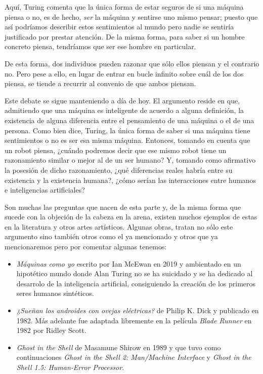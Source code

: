 \documentclass[12pt,a4paper]{article}
\begin{document}
Aquí, Turing comenta que la única forma de estar seguros de si una máquina piensa o no, es de hecho, \emph{ser} la máquina y sentirse uno mismo pensar; puesto que así podríamos describir estos sentimientos al mundo pero nadie se sentiría justificado por prestar atención. De la misma forma, para saber si un hombre concreto piensa, tendríamos que ser ese hombre en particular.

De esta forma, dos individuos pueden razonar que sólo ellos piensan y el contrario no. Pero pese a ello, en lugar de entrar en bucle infinito sobre cuál de los dos piensa, se tiende a recurrir al convenio de que ambos piensan.

Este debate se sigue manteniendo a día de hoy. El argumento reside en que, admitiendo que una máquina es inteligente de acuerdo a alguna definición, la existencia de alguna diferencia entre el pensamiento de una máquina o el de una persona. Como bien dice, Turing, la única forma de saber si una máquina tiene sentimientos o no es ser esa misma máquina. Entonces, tomando en cuenta que un robot piensa, ¿cuándo podremos decir que ese mismo robot tiene un razonamiento similar o mejor al de un ser humano? Y, tomando como afirmativo la posesión de dicho razonamiento, ¿qué diferencias reales habría entre su existencia y la existencia humana?, ¿cómo serían las interacciones entre humanos e inteligencias artificiales?

Son muchas las preguntas que nacen de esta parte y, de la misma forma que sucede con la objeción de la cabeza en la arena, existen muchos ejemplos de estas en la literatura y otros artes artísticos. Algunas obras, tratan no sólo este argumento sino también otros como el ya mencionado y otros que ya mencionaremos pero por comentar algunas tenemos:

\begin{itemize}
\item \emph{Máquinas como yo}\cite{Maquinas} escrito por Ian McEwan en 2019 y ambientado en un hipotético mundo donde Alan Turing no se ha suicidado y se ha dedicado al desarrolo de la inteligencia artificial, consiguiendo la creación de los primeros seres humanos sintéticos.
\item \emph{¿Sueñan los androides con ovejas eléctricas?}\cite{Androides} de Philip K. Dick y publicado en 1982. Más adelante fue adaptada libremente en la película \emph{Blade Runner} en 1982 por Ridley Scott.
\item \emph{Ghost in the Shell}\cite{Shell} de Masamune Shirow en 1989 y que tuvo como continuaciones \emph{Ghost in the Shell 2: Man/Machine Interface} y \emph{Ghost in the Shell 1.5: Human-Error Processor}.
\end{itemize}
\end{document}

